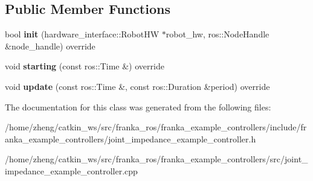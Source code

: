 \subsection*{Public Member Functions}
\begin{DoxyCompactItemize}
\item 
\mbox{\label{classfranka__example__controllers_1_1_joint_impedance_example_controller_a8163440bff59a3067be1d47e4b3c3c84}} 
bool {\bfseries init} (hardware\+\_\+interface\+::\+Robot\+HW $\ast$robot\+\_\+hw, ros\+::\+Node\+Handle \&node\+\_\+handle) override
\item 
\mbox{\label{classfranka__example__controllers_1_1_joint_impedance_example_controller_a968df72e561b1c35c4c406eb5cd79011}} 
void {\bfseries starting} (const ros\+::\+Time \&) override
\item 
\mbox{\label{classfranka__example__controllers_1_1_joint_impedance_example_controller_afd7edb0e2600dd7732b0bf00e14d41c2}} 
void {\bfseries update} (const ros\+::\+Time \&, const ros\+::\+Duration \&period) override
\end{DoxyCompactItemize}


The documentation for this class was generated from the following files\+:\begin{DoxyCompactItemize}
\item 
/home/zheng/catkin\+\_\+ws/src/franka\+\_\+ros/franka\+\_\+example\+\_\+controllers/include/franka\+\_\+example\+\_\+controllers/joint\+\_\+impedance\+\_\+example\+\_\+controller.\+h\item 
/home/zheng/catkin\+\_\+ws/src/franka\+\_\+ros/franka\+\_\+example\+\_\+controllers/src/joint\+\_\+impedance\+\_\+example\+\_\+controller.\+cpp\end{DoxyCompactItemize}

